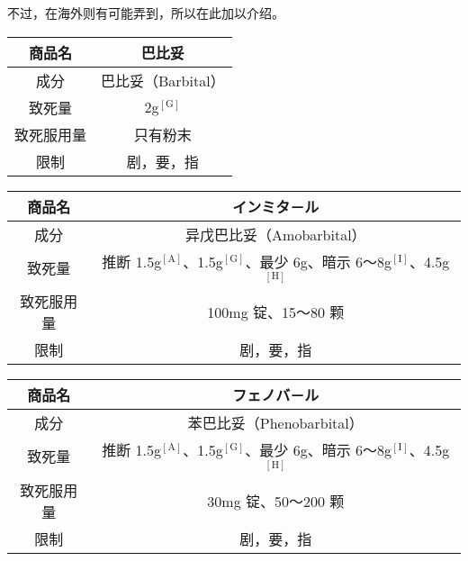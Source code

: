 \documentclass[UTF8]{ctexart}
\begin{document}
不过，在海外则有可能弄到，所以在此加以介绍。

\begin{table}[htbp]
\begin{center}
\begin{tabular}{cc}

\toprule
商品名 & 巴比妥
 \\
\midrule
成分 & 巴比妥（Barbital） \\
致死量 & 2g$^\mathrm{[G]}$ \\
致死服用量 & 只有粉末 \\
限制& 剧，要，指 \\
\bottomrule
\end{tabular}
\end{center}
\end{table}


\begin{table}[htbp]
\begin{center}
\begin{tabular}{cc}

\toprule
商品名 & インミタ－ル
 \\
\midrule
成分 & 异戊巴比妥（Amobarbital） \\
致死量 & 推断 1.5g$^\mathrm{[A]}$、1.5g$^\mathrm{[G]}$、最少 6g、暗示 6～8g$^\mathrm{[I]}$、4.5g$^\mathrm{[H]}$ \\
致死服用量 & 100mg 锭、15～80 颗 \\
限制& 剧，要，指 \\
\bottomrule
\end{tabular}
\end{center}
\end{table}


\begin{table}[htbp]
\begin{center}
\begin{tabular}{cc}

\toprule
商品名 & フェノバ－ル
 \\
\midrule
成分 & 苯巴比妥（Phenobarbital） \\
致死量 & 推断 1.5g$^\mathrm{[A]}$、1.5g$^\mathrm{[G]}$、最少 6g、暗示 6～8g$^\mathrm{[I]}$、4.5g$^\mathrm{[H]}$ \\
致死服用量 & 30mg 锭、50～200 颗 \\
限制& 剧，要，指 \\
\bottomrule
\end{tabular}
\end{center}
\end{table}
\end{document}
